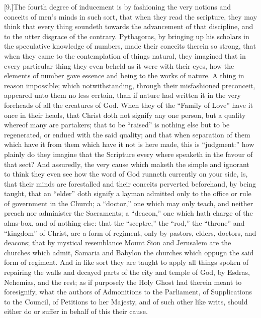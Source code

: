 [9.]The fourth degree of inducement is by fashioning the very notions and conceits of men’s minds in such sort, that when they read the scripture, they may think that every thing soundeth towards the advancement of that discipline, and to the utter disgrace of the contrary. Pythagoras, by bringing up his scholars in the speculative knowledge of numbers, made their conceits therein so strong, that when they came to the contemplation of things natural, they imagined that in every particular thing they even beheld as it were with their eyes, how the elements of number gave essence and being to the works of nature. A thing in reason impossible; which notwithstanding, through their misfashioned preconceit, appeared unto them no less certain, than if nature had written it in the very foreheads of all the creatures of God. When they of the “Family of Love” have it once in their heads, that Christ doth not signify any one person, but a quality whereof many are partakers; that to be “raised” is nothing else but to be regenerated, or endued with the said quality; and that when separation of them which have it from them which have it not is here made, this is “judgment:” how plainly do they imagine that the Scripture every where speaketh in the favour of that sect? And assuredly, the very cause which maketh the simple and ignorant to think they even see how the word of God runneth currently on your side, is, that their minds are forestalled and their conceits perverted beforehand, by being taught, that an “elder” doth signify a layman admitted only to the office or rule of government in the Church; a “doctor,” one which may only teach, and neither preach nor administer the Sacraments; a “deacon,” one which hath charge of the alms-box, and of nothing else: that the “sceptre,” the “rod,” the “throne” and “kingdom” of Christ, are a form of regiment, only by pastors, elders, doctors, and deacons; that by mystical resemblance Mount Sion and Jerusalem are the churches which admit, Samaria and Babylon the churches which oppugn the said form of regiment. And in like sort they are taught to apply all things spoken of repairing the walls and decayed parts of the city and temple of God, by Esdras, Nehemias, and the rest; as if purposely the Holy Ghost had therein meant to foresignify, what the authors of Admonitions to the Parliament, of Supplications to the Council, of Petitions to her Majesty, and of such other like writs, should either do or suffer in behalf of this their cause.

